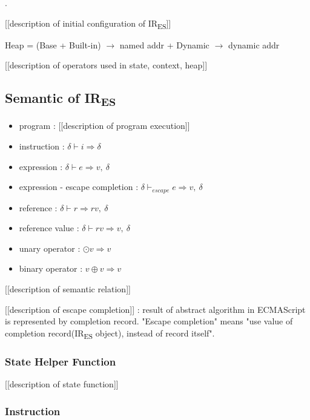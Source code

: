 \documentclass[11pt]{article}
\newcommand{\irname}[0]{IR\textsubscript{ES}\xspace}
\newcommand{\symstate}[0]{\delta}
\newcommand{\symuop}[0]{\odot}
\newcommand{\symbop}[0]{\oplus}
\newcommand{\evaluop}[2]{\symuop #1 \Rightarrow #2}
\newcommand{\evalbop}[3]{#1 \symbop #2 \Rightarrow #3}
\newcommand{\evalinst}[3]{#1 \vdash #2 \Rightarrow #3}
\newcommand{\evalexpr}[4]{#1 \vdash #2 \Rightarrow #3,\ #4}
\newcommand{\evalescexpr}[4]{#1 \vdash_{escape} #2 \Rightarrow #3,\ #4}
\newcommand{\evalref}[4]{#1 \vdash #2 \Rightarrow #3,\ #4}
\newcommand{\evalrefv}[4]{#1 \vdash #2 \Rightarrow #3,\ #4}
\begin{document}
.

[[description of initial configuration of \irname]]

Heap = (Base + Built-in) $\rightarrow$ named addr + Dynamic $\rightarrow$
dynamic addr

[[description of operators used in state, context, heap]]

\newpage

\subsection{Semantic of \irname}

\begin{itemize}
  \item program : [[description of program execution]]
  \item instruction : $\evalinst{\symstate}{i}{\symstate}$
  \item expression : $\evalexpr{\symstate}{e}{v}{\symstate}$
  \item expression - escape completion :
  $\evalescexpr{\symstate}{e}{v}{\symstate}$
  \item reference : $\evalref{\symstate}{r}{rv}{\symstate}$
  \item reference value : $\evalrefv{\symstate}{rv}{v}{\symstate}$
  \item unary operator : $\evaluop{v}{v}$
  \item binary operator : $\evalbop{v}{v}{v}$
\end{itemize}

[[description of semantic relation]] 

[[description of escape completion]] : result of abstract algorithm in ECMAScript
is represented by completion record. "Escape completion" means "use value of 
completion record(\irname object), instead of record itself".

\subsubsection{State Helper Function}
[[description of state function]]

\newpage

\subsubsection{Instruction}
\end{document}
